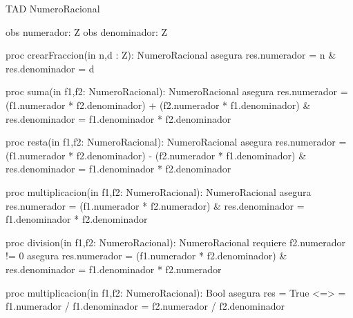 TAD NumeroRacional{
    obs numerador: Z
    obs denominador: Z

    proc crearFraccion(in n,d : Z): NumeroRacional{
        asegura {res.numerador = n & res.denominador = d}
    }

    proc suma(in f1,f2: NumeroRacional): NumeroRacional{
        asegura {res.numerador = (f1.numerador * f2.denominador) + (f2.numerador * f1.denominador)
                  & res.denominador = f1.denominador * f2.denominador}
    }

    proc resta(in f1,f2: NumeroRacional): NumeroRacional{
        asegura {res.numerador = (f1.numerador * f2.denominador) - (f2.numerador * f1.denominador)
                  & res.denominador = f1.denominador * f2.denominador}
    }

    proc multiplicacion(in f1,f2: NumeroRacional): NumeroRacional{
        asegura {res.numerador = (f1.numerador * f2.numerador) 
                  & res.denominador = f1.denominador * f2.denominador}
    }

    proc division(in f1,f2: NumeroRacional): NumeroRacional{
        requiere {f2.numerador != 0}
        asegura {res.numerador = (f1.numerador * f2.denominador) 
                  & res.denominador = f1.denominador * f2.numerador}
    }

    proc multiplicacion(in f1,f2: NumeroRacional): Bool{
        asegura {res = True <=> = f1.numerador / f1.denominador = f2.numerador / f2.denominador}
    }

}